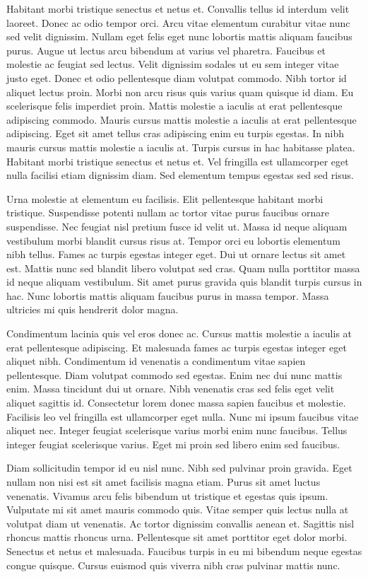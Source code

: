 \documentclass[11pt,a4paper]{article}
\begin{document}
Habitant morbi tristique senectus et netus et. Convallis tellus id interdum velit laoreet. Donec ac odio tempor orci. Arcu vitae elementum curabitur vitae nunc sed velit dignissim. Nullam eget felis eget nunc lobortis mattis aliquam faucibus purus. Augue ut lectus arcu bibendum at varius vel pharetra. Faucibus et molestie ac feugiat sed lectus. Velit dignissim sodales ut eu sem integer vitae justo eget. Donec et odio pellentesque diam volutpat commodo. Nibh tortor id aliquet lectus proin. Morbi non arcu risus quis varius quam quisque id diam. Eu scelerisque felis imperdiet proin. Mattis molestie a iaculis at erat pellentesque adipiscing commodo. Mauris cursus mattis molestie a iaculis at erat pellentesque adipiscing. Eget sit amet tellus cras adipiscing enim eu turpis egestas. In nibh mauris cursus mattis molestie a iaculis at. Turpis cursus in hac habitasse platea. Habitant morbi tristique senectus et netus et. Vel fringilla est ullamcorper eget nulla facilisi etiam dignissim diam. Sed elementum tempus egestas sed sed risus.

Urna molestie at elementum eu facilisis. Elit pellentesque habitant morbi tristique. Suspendisse potenti nullam ac tortor vitae purus faucibus ornare suspendisse. Nec feugiat nisl pretium fusce id velit ut. Massa id neque aliquam vestibulum morbi blandit cursus risus at. Tempor orci eu lobortis elementum nibh tellus. Fames ac turpis egestas integer eget. Dui ut ornare lectus sit amet est. Mattis nunc sed blandit libero volutpat sed cras. Quam nulla porttitor massa id neque aliquam vestibulum. Sit amet purus gravida quis blandit turpis cursus in hac. Nunc lobortis mattis aliquam faucibus purus in massa tempor. Massa ultricies mi quis hendrerit dolor magna.

Condimentum lacinia quis vel eros donec ac. Cursus mattis molestie a iaculis at erat pellentesque adipiscing. Et malesuada fames ac turpis egestas integer eget aliquet nibh. Condimentum id venenatis a condimentum vitae sapien pellentesque. Diam volutpat commodo sed egestas. Enim nec dui nunc mattis enim. Massa tincidunt dui ut ornare. Nibh venenatis cras sed felis eget velit aliquet sagittis id. Consectetur lorem donec massa sapien faucibus et molestie. Facilisis leo vel fringilla est ullamcorper eget nulla. Nunc mi ipsum faucibus vitae aliquet nec. Integer feugiat scelerisque varius morbi enim nunc faucibus. Tellus integer feugiat scelerisque varius. Eget mi proin sed libero enim sed faucibus.

Diam sollicitudin tempor id eu nisl nunc. Nibh sed pulvinar proin gravida. Eget nullam non nisi est sit amet facilisis magna etiam. Purus sit amet luctus venenatis. Vivamus arcu felis bibendum ut tristique et egestas quis ipsum. Vulputate mi sit amet mauris commodo quis. Vitae semper quis lectus nulla at volutpat diam ut venenatis. Ac tortor dignissim convallis aenean et. Sagittis nisl rhoncus mattis rhoncus urna. Pellentesque sit amet porttitor eget dolor morbi. Senectus et netus et malesuada. Faucibus turpis in eu mi bibendum neque egestas congue quisque. Cursus euismod quis viverra nibh cras pulvinar mattis nunc.
\end{document}
